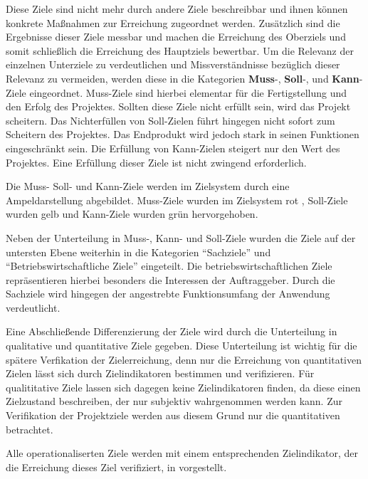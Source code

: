 Diese Ziele sind nicht mehr durch andere Ziele beschreibbar und 
ihnen können konkrete Maßnahmen zur Erreichung zugeordnet werden. Zusätzlich sind die
Ergebnisse dieser Ziele messbar und machen die Erreichung des Oberziels und
somit schließlich die Erreichung des Hauptziels bewertbar. Um die Relevanz der
einzelnen Unterziele zu verdeutlichen und Missverständnisse bezüglich dieser
Relevanz zu vermeiden, werden diese in die Kategorien \textbf{Muss}-, \textbf{Soll}-, und
\textbf{Kann}-Ziele eingeordnet. 
Muss-Ziele sind hierbei elementar für die
Fertigstellung und den Erfolg des Projektes. Sollten diese Ziele nicht erfüllt
sein, wird das Projekt scheitern. Das Nichterfüllen von Soll-Zielen führt
hingegen nicht sofort zum Scheitern des Projektes. Das Endprodukt wird jedoch
stark in seinen Funktionen eingeschränkt sein. Die Erfüllung von Kann-Zielen
steigert nur den Wert des Projektes. Eine Erfüllung dieser Ziele ist nicht
zwingend erforderlich.

Die Muss- Soll- und Kann-Ziele werden im Zielsystem durch eine Ampeldarstellung
abgebildet.  Muss-Ziele wurden im Zielsystem rot , Soll-Ziele
wurden gelb und Kann-Ziele wurden grün hervorgehoben.

Neben der Unterteilung in Muss-, Kann- und Soll-Ziele wurden die Ziele auf der
untersten Ebene weiterhin in die Kategorien "`Sachziele"' und
"`Betriebswirtschaftliche Ziele"' eingeteilt. Die betriebswirtschaftlichen
Ziele repräsentieren hierbei besonders die Interessen der Auftraggeber. Durch
die Sachziele wird hingegen der angestrebte Funktionsumfang der Anwendung
verdeutlicht.

Eine Abschließende Differenzierung der Ziele wird durch die Unterteilung 
in qualitative und quantitative Ziele gegeben. Diese Unterteilung ist wichtig
für die spätere Verfikation der Zielerreichung, denn nur die Erreichung von quantitativen
Zielen lässt sich durch Zielindikatoren bestimmen und verifizieren. 
Für qualititative Ziele lassen sich dagegen keine Zielindikatoren
finden, da diese einen Zielzustand beschreiben, der nur subjektiv wahrgenommen werden kann.
Zur Verifikation der Projektziele werden aus diesem Grund nur die quantitativen betrachtet.

Alle operationaliserten Ziele werden mit einem entsprechenden Zielindikator, der die Erreichung dieses
Ziel verifiziert, in  vorgestellt.